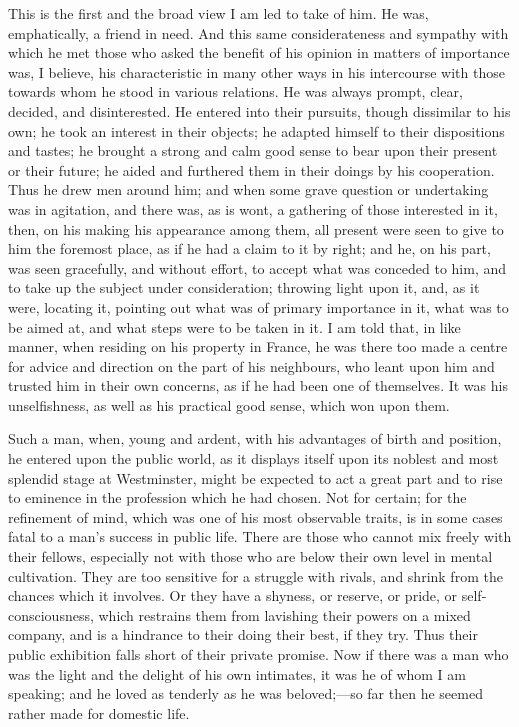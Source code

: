 This is the first and the broad view I am led to take
of him. He was, emphatically, a friend in need. And this
same considerateness and sympathy with which he met those
who asked the benefit of his opinion in matters of
importance was, I believe, his characteristic in many
other ways in his intercourse with those towards whom he
stood in various relations. He was always prompt, clear,
decided, and disinterested. He entered into their
pursuits, though dissimilar to his own; he took an
interest in their objects; he adapted himself to their
dispositions and tastes; he brought a strong and calm
good sense to bear upon their present or their future; he
aided and furthered them in their doings by his cooperation. Thus he drew men around him; and when some
grave question or undertaking was in agitation, and there
was, as is wont, a gathering of those interested in it,
then, on his making his appearance among them, all
present were seen to give to him the foremost place, as
if he had a claim to it by right; and he, on his part,
was seen gracefully, and without effort, to accept what
was conceded to him, and to take up the subject under
consideration; throwing light upon it, and, as it were,
locating it, pointing out what was of primary importance
in it, what was to be aimed at, and what steps were to be
taken in it. I am told that, in like manner, when
residing on his property in France, he was there too made
a centre for advice and direction on the part of his
neighbours, who leant upon him and trusted him in their
own concerns, as if he had been one of themselves. It was
his unselfishness, as well as his practical good sense,
which won upon them.

Such a man, when, young and ardent, with his
advantages of birth and position, he entered upon the
public world, as it displays itself upon its noblest and
most splendid stage at Westminster, might be expected to
act a great part and to rise to eminence in the
profession which he had chosen. Not for certain; for the
refinement of mind, which was one of his most observable
traits, is in some cases fatal to a man's success in
public life. There are those who cannot mix freely with
their fellows, especially not with those who are below
their own level in mental cultivation. They are too
sensitive for a struggle with rivals, and shrink from the
chances which it involves. Or they have a shyness, or
reserve, or pride, or self-consciousness, which restrains
them from lavishing their powers on a mixed company, and
is a hindrance to their doing their best, if they try.
Thus their public exhibition falls short of their private
promise. Now if there was a man who was the light and the
delight of his own intimates, it was he of whom I am
speaking; and he loved as tenderly as he was
beloved;—so far then he seemed rather made for
domestic life.

